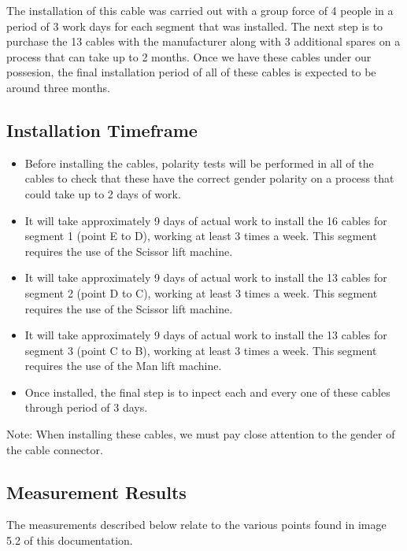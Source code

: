 The installation of this cable was carried out with a group force of 4 people in a period of 3 work days for each segment that was installed. The next step is to purchase the 13 cables with the manufacturer along with 3 additional spares on a process that can take up to 2 months. Once we have these cables under our possesion, the final installation period of all of these cables is expected to be around three months. 

\subsection{Installation Timeframe}

\begin{itemize}

  \item Before installing the cables, polarity tests will be performed in all of the cables to check that these have the correct gender polarity on a process that could take up to 2 days of work.  
  
  \item It will take approximately 9 days of actual work to install the 16 cables for segment 1 (point E to D), working at least 3 times a week. This segment requires the use of the Scissor lift machine. 
  
  \item It will take approximately 9 days of actual work to install the 13 cables for segment 2 (point D to C), working at least 3 times a week. This segment requires the use of the Scissor lift machine.
  
  \item It will take approximately 9 days of actual work to install the 13 cables for segment 3 (point C to B), working at least 3 times a week. This segment requires the use of the Man lift machine.
  
  \item Once installed, the final step is to inpect each and every one of these cables through period of 3 days. 
\end{itemize}

Note: When installing these cables, we must pay close attention to the gender of the cable connector.

\subsection{Measurement Results}

The measurements described below relate to the various points found in image 5.2 of this documentation.

